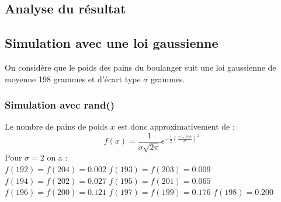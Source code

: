 \documentclass[a4paper,11pt]{book}
\begin{document}
\subsection{Analyse du r\'esultat}
\subsection{Simulation avec une loi gaussienne}
On consid\`ere que le poids des pains du boulanger suit une loi gaussienne 
de moyenne 198 grammes et d'\'ecart type $\sigma$ grammes.
\subsubsection{Simulation avec rand()}
Le nombre de pains de poids $x$ est donc approximativement de :\\
$$f(x)=\frac{1}{\sigma \sqrt{2\pi}} e^{-\frac{1}{2}(\frac{x-198}{\sigma})^2}$$ 
Pour  $\sigma=2$ on a :\\
$f(192)=f(204)=0.002 $
$f(193)=f(203)=0.009 $
$f(194)=f(202)=0.027 $
$f(195)=f(201)=0.065 $
$f(196)=f(200)=0.121 $
$f(197)=f(199)=0.176 $
$f(198)=0.200 $
\end{document}
